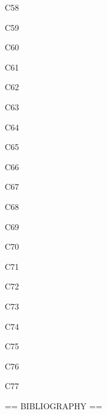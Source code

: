 \documentclass[paper={1500mm,1000mm},line_length=1450mm,number_of_lines=150]{jlreq}
\newcommand*{\case}[2]{#1 #2\par}
\begin{document}
\case{C58}{\textcite[78=86]{Goffman1984}}
\case{C59}{\parencite{Oda1991}}
\case{C60}{\parencite{Oda1991ed}}
\case{C61}{\parencite{Usui1997}}
\case{C62}{\parencite{Iwamoto1997}}
\case{C63}{\parencite{Fujitake2008}}
\case{C64}{\parencite{Beck1998}}
\case{C65}{\parencite{Beck1992}}
\case{C66}{\parencite{Mainichi1998}}
\case{C67}{\parencite{Mainichi1999}}
\case{C68}{\parencite{Nakaoka1975}}
\case{C69}{\parencite{Walsh1998}}
\case{C70}{\parencite{Kenshi1956}}
\case{C71}{\parencite{City1985}}
\case{C72}{\parencite{City2016}}
\case{C73}{\parencite{City1990}}
\case{C74}{\parencite{ASRperiodical1988}}
\case{C75}{\parencite{Shakai1988}}
\case{C76}{\parencite{NoEditorPeriodical1988}}
\case{C77}{\parencite{NoEditorNoIssue1989}}
== BIBLIOGRAPHY ==\par
\nocite{City1985,City2016,City1990,ASRperiodical1988,Shakai1988,NoEditorPeriodical1988,NoEditorNoIssue1989}
\nocite{Berger1972,Douglas1970,Rubington1965,Mayer1995,Abbott1995,
  Bourdieu1996,Bourdieu1991,Inagami1981,Maki1977a,Maki1977b,Oguma1995,
  Miyajima1985,Sugimoto1995,Kosaka1998,Funabashi1998,SatoY1998,
  Sakurai1993,Kambara1999,Naikakufu2009,Shizuoka1972,Schafer2003,
  WatanabeT2008,Scott2005,JSS2006,JSS2009,Yamanaka2004,JHU2003,ICPSR2009,
  DeLong2007,Somusho2007,NCHS2007,
  Yamamoto1998,Usui1997,Iwamoto1993,Iwamoto1997,Taylor2005,Lowe2003,Kenshi1956,Miyauchi1929,Fenn1931,
  Nomura2010,Nomura2015,Nomura2020,Cole2009,Fujitake2008,Shimizu1999,Rivera2001,
  Doe2012,Lee2014,Morita2018,Tanaka2022,Tanaka2023,Sato2019,Roe2015,Park2018,
  JGSS2003,Gallup1976,Abe2020,Gray2019,
  Endo2021,Meyer2007,Beck1998,Beck1992,
  Nakaoka1975,Walsh1998,Walsh1999,
  LegacyWeb2010,LegacyReport2018,
  Hart1990,
  Nishimura1990,Norton2004,Owen2010,Tetsudo1971,Rekishi1980,
  Shinbun1990,Insatsu1985,Wakabayashi2012,Wakabayashi2014}
\printbibliography[heading=none]
\end{document}
